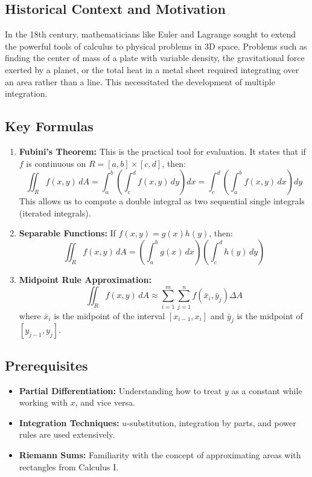\documentclass[11pt,a4paper]{article}
\begin{document}
\subsection{Historical Context and Motivation}
In the 18th century, mathematicians like Euler and Lagrange sought to extend the powerful tools of calculus to physical problems in 3D space. Problems such as finding the center of mass of a plate with variable density, the gravitational force exerted by a planet, or the total heat in a metal sheet required integrating over an area rather than a line. This necessitated the development of multiple integration.

\subsection{Key Formulas}
\begin{enumerate}
    \item \textbf{Fubini's Theorem:} This is the practical tool for evaluation. It states that if $f$ is continuous on $R = [a,b] \times [c,d]$, then:
    \[ \iint_R f(x,y) \, dA = \int_a^b \left( \int_c^d f(x,y) \, dy \right) dx = \int_c^d \left( \int_a^b f(x,y) \, dx \right) dy \]
    This allows us to compute a double integral as two sequential single integrals (iterated integrals).
    
    \item \textbf{Separable Functions:} If $f(x,y) = g(x)h(y)$, then:
    \[ \iint_R f(x,y) \, dA = \left( \int_a^b g(x) \, dx \right) \left( \int_c^d h(y) \, dy \right) \]
    
    \item \textbf{Midpoint Rule Approximation:}
    \[ \iint_R f(x,y) \, dA \approx \sum_{i=1}^m \sum_{j=1}^n f(\bar{x}_i, \bar{y}_j) \Delta A \]
    where $\bar{x}_i$ is the midpoint of the interval $[x_{i-1}, x_i]$ and $\bar{y}_j$ is the midpoint of $[y_{j-1}, y_j]$.
\end{enumerate}

\subsection{Prerequisites}
\begin{itemize}
    \item \textbf{Partial Differentiation:} Understanding how to treat $y$ as a constant while working with $x$, and vice versa.
    \item \textbf{Integration Techniques:} $u$-substitution, integration by parts, and power rules are used extensively.
    \item \textbf{Riemann Sums:} Familiarity with the concept of approximating areas with rectangles from Calculus I.
\end{itemize}
\end{document}
